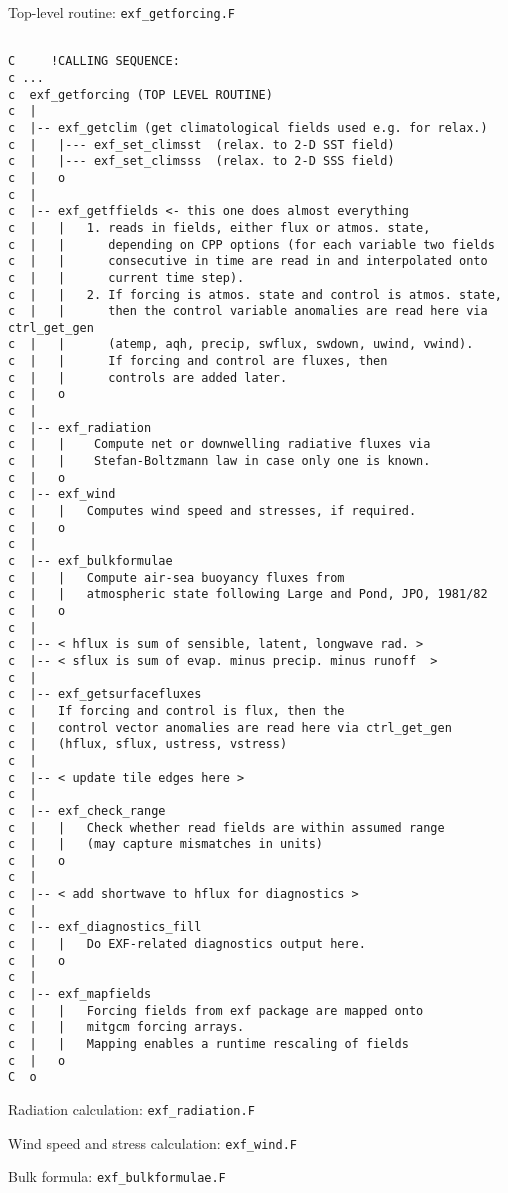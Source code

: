 Top-level routine: \texttt{exf\_getforcing.F}

{\footnotesize
\begin{verbatim}

C     !CALLING SEQUENCE:
c ...
c  exf_getforcing (TOP LEVEL ROUTINE)
c  |
c  |-- exf_getclim (get climatological fields used e.g. for relax.)
c  |   |--- exf_set_climsst  (relax. to 2-D SST field)
c  |   |--- exf_set_climsss  (relax. to 2-D SSS field)
c  |   o
c  |
c  |-- exf_getffields <- this one does almost everything
c  |   |   1. reads in fields, either flux or atmos. state,
c  |   |      depending on CPP options (for each variable two fields
c  |   |      consecutive in time are read in and interpolated onto
c  |   |      current time step).
c  |   |   2. If forcing is atmos. state and control is atmos. state,
c  |   |      then the control variable anomalies are read here via ctrl_get_gen
c  |   |      (atemp, aqh, precip, swflux, swdown, uwind, vwind).
c  |   |      If forcing and control are fluxes, then
c  |   |      controls are added later.
c  |   o
c  |
c  |-- exf_radiation
c  |   |    Compute net or downwelling radiative fluxes via
c  |   |    Stefan-Boltzmann law in case only one is known.
c  |   o
c  |-- exf_wind
c  |   |   Computes wind speed and stresses, if required.
c  |   o
c  |
c  |-- exf_bulkformulae
c  |   |   Compute air-sea buoyancy fluxes from
c  |   |   atmospheric state following Large and Pond, JPO, 1981/82
c  |   o
c  |
c  |-- < hflux is sum of sensible, latent, longwave rad. >
c  |-- < sflux is sum of evap. minus precip. minus runoff  >
c  |
c  |-- exf_getsurfacefluxes
c  |   If forcing and control is flux, then the
c  |   control vector anomalies are read here via ctrl_get_gen
c  |   (hflux, sflux, ustress, vstress)
c  |
c  |-- < update tile edges here >
c  |
c  |-- exf_check_range
c  |   |   Check whether read fields are within assumed range
c  |   |   (may capture mismatches in units)
c  |   o
c  |
c  |-- < add shortwave to hflux for diagnostics >
c  |
c  |-- exf_diagnostics_fill
c  |   |   Do EXF-related diagnostics output here.
c  |   o
c  |
c  |-- exf_mapfields
c  |   |   Forcing fields from exf package are mapped onto
c  |   |   mitgcm forcing arrays.
c  |   |   Mapping enables a runtime rescaling of fields
c  |   o
C  o
\end{verbatim}
}

Radiation calculation: \texttt{exf\_radiation.F}

Wind speed and stress calculation: \texttt{exf\_wind.F}

Bulk formula: \texttt{exf\_bulkformulae.F}

